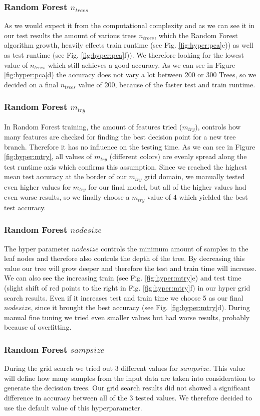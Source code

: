 \documentclass[conference]{IEEEtran}
\begin{document}
\textcolor{til}{
\subsubsection{Random Forest $n_{trees}$}
As we would expect it from the computational complexity and as we can see it in our test results the amount of various trees $n_{trees}$, which the Random Forest algorithm growth, heavily effects train runtime (see Fig. \ref{fig:hyper:pca}e)) as well as test runtime (see Fig. \ref{fig:hyper:pca}f)). We therefore looking for the lowest value of $n_{trees}$ which still achieves a good accuracy. As we can see in Figure \ref{fig:hyper:pca}d) the accuracy does not vary a lot between 200 or 300 Trees, so we decided on a final $n_{trees}$ value of 200, because of the faster test and train runtime.
\subsubsection{Random Forest $m_{try}$}
In Random Forest training, the amount of features tried ($m_{try}$), controls how many features are checked for finding the best decision point for a new tree branch. Therefore it has no influence on the testing time. As we can see in Figure \ref{fig:hyper:mtry}, all values of $m_{try}$ (different colors) are evenly spread along the test runtime axis which confirms this assumption. Since we reached the highest mean test accuracy at the border of our $m_{try}$ grid domain, we manually tested even higher values for $m_{try}$ for our final model, but all of the higher values had even worse results, so we finally choose a $m_{try}$ value of 4 which yielded the best test accuracy.
\subsubsection{Random Forest ${nodesize}$}
The hyper parameter ${nodesize}$ controls the minimum amount of samples in the leaf nodes and therefore also controls the depth of the tree. By decreasing this value our tree will grow deeper and therefore the test and train time will increase. We can also see the increasing train (see Fig. \ref{fig:hyper:mtry}e) and test time (slight shift of red points to the right in Fig. \ref{fig:hyper:mtry}f) in our hyper grid search results. Even if it increases test and train time we choose 5 as our final ${nodesize}$, since it brought the best accuracy (see Fig. \ref{fig:hyper:mtry}d). During manual fine tuning we tried even smaller values but had worse results, probably because of overfitting.
\subsubsection{Random Forest ${sampsize}$}
During the grid search we tried out 3 different values for ${sampsize}$. This value will define how many samples from the input data are taken into consideration to generate the decission trees. Our grid search results did not showed a significant difference in accuracy between all of the 3 tested values. We therefore decided to use the default value of this hyperparameter.
}
\end{document}
